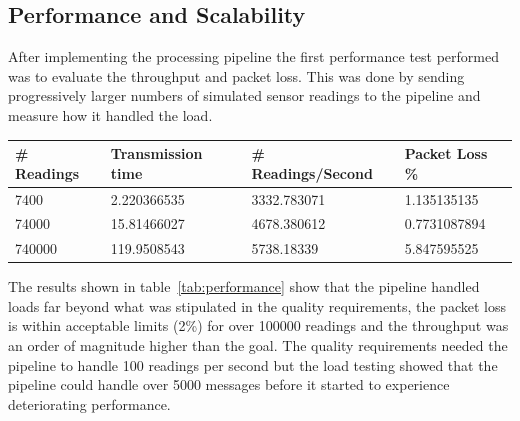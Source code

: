 \documentclass[prodmode,acmtosem]{acmsmall} %
\begin{document}
\subsection{Performance and Scalability}
After implementing the processing pipeline the first performance test performed was to evaluate the throughput and packet loss. This was done by sending progressively larger numbers of simulated sensor readings to the pipeline and measure how it handled the load.

\begin{center}
\begin{tabularx}{\textwidth}{| X | X | X | X |} 
\hline
\# Readings & Transmission time & \# Readings/Second & Packet Loss \% \\
\hline
7400 & 2.220366535 & 3332.783071 & 1.135135135 \\
\hline
74000 & 15.81466027 & 4678.380612 & 0.7731087894 \\
\hline
740000 & 119.9508543 & 5738.18339 & 5.847595525 \\
\hline
\end{tabularx}
\label{tab:performance}
\end{center}

The results shown in table~\ref{tab:performance} show that the pipeline handled loads far beyond what was stipulated in the quality requirements, the packet loss is within acceptable limits (2\%) for over 100000 readings and the throughput was an order of magnitude higher than the goal. The quality requirements needed the pipeline to handle 100 readings per second but the load testing showed that the pipeline could handle over 5000 messages before it started to experience deteriorating performance.


\end{document}
